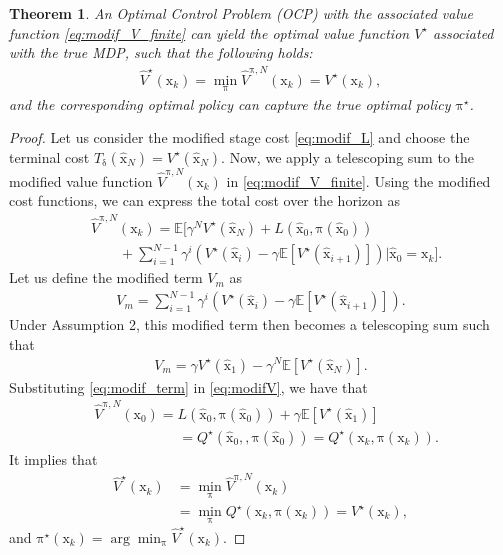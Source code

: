 \documentclass[10pt,twocolumn,twoside]{IEEEtran}
\newcommand{\vect}[1]{\ensuremath{\boldsymbol{\mathrm{#1}}}}
\newtheorem{theorem}{Theorem}
\begin{document}
\begin{theorem}\label{theorem:V_modif}
    An Optimal Control Problem (OCP) with the associated value function \eqref{eq:modif_V_finite} can yield the optimal value function $V^\star$ associated with the true MDP, such that the following holds:
    \begin{align}
        \hat V^\star\left(\vect x_k\right)=\min_{\vect\pi}\hat V^{\vect\pi,N}\left(\vect x_k\right)=V^\star\left(\vect x_k\right),
    \end{align}
    and the corresponding optimal policy can capture the true optimal policy $\vect\pi^\star$.
\end{theorem}
\begin{proof}
Let us consider the modified stage cost \eqref{eq:modif_L} and choose the terminal cost $T_{\vect{\delta}}(\hat{\vect{x}}_N) = V^\star(\hat{\vect{x}}_N)$. Now, we apply a telescoping sum to the modified value function \(\hat{V}^{\vect{\pi}, N}(\vect{x}_k)\) in \eqref{eq:modif_V_finite}. Using the modified cost functions, we can express the total cost over the horizon as
\begin{align}\label{eq:modifV}
    &\hat V^{\vect\pi,N}\left(\vect x_k\right)=\mathbb{E}\Bigg[\gamma^N V^\star(\hat{\vect{x}}_N)+L\left(\hat{\vect {x}}_0,\vect\pi\left(\hat{\vect {x}}_0\right)\right)\\\nonumber
    &\qquad+\sum_{i=1}^{N-1}\gamma^i\left(V^\star(\hat{\vect{x}}_i) - \gamma \mathbb{E}[V^\star(\hat{\vect{x}}_{i+1})]\right)\Big|\hat{\vect {x}}_0=\vect x_k\Bigg].
\end{align}
Let us define the modified term $V_m$ as
\begin{align}
    V_m=\sum_{i=1}^{N-1}\gamma^i\left(V^\star(\hat{\vect{x}}_i) - \gamma \mathbb{E}[V^\star(\hat{\vect{x}}_{i+1})]\right).
\end{align}
Under Assumption 2, this modified term then becomes a telescoping sum such that
\begin{align}\label{eq:modif_term}
    V_m=\gamma V^\star(\hat{\vect{x}}_1)-\gamma^N\mathbb{E}[V^\star(\hat{\vect{x}}_N)].
\end{align}
Substituting \eqref{eq:modif_term} in \eqref{eq:modifV}, we have that
\begin{align}
    &\hat V^{\vect\pi,N}\left(\vect x_0\right)=L\left(\hat{\vect {x}}_0,\vect\pi\left(\hat{\vect {x}}_0\right)\right)+\gamma\mathbb{E}[V^\star(\hat{\vect{x}}_{1})]\\\nonumber
&\qquad\qquad\qquad=Q^\star(\hat{\vect{x}}_{0},,\vect\pi\left(\hat{\vect {x}}_0\right))=Q^\star({\vect{x}}_{k},\vect\pi\left({\vect {x}}_k\right)).
\end{align}
It implies that
\begin{align}
    \hat V^\star\left(\vect x_k\right)&=\min_{\vect\pi}\hat V^{\vect\pi,N}\left(\vect x_k\right)\\\nonumber
    &=\min_{\vect\pi}Q^\star({\vect{x}}_{k},\vect\pi\left({\vect {x}}_k\right))=V^\star\left(\vect x_k\right),
\end{align}
and ${\vect{\pi}}^\star\left(\vect x_k\right)=\arg\min_{{\vect{\pi}}} \hat V^\star\left(\vect x_k\right)$.
\end{proof}
\end{document}
